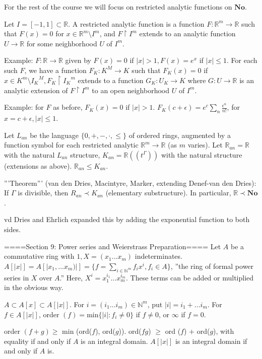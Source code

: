 For the rest of the course we will focus on restricted analytic functions on $\mathbf{No}$.

Let $I=[-1,1] \subset \mathbb{R}$. A restricted analytic function is a function $F: \mathbb{R}^m \rightarrow \mathbb{R}$ such that $F(x)=0$ for $x \in \mathbb{R}^{m} \setminus I^m$, and $F \restriction I^m$ extends to an analytic function $U \rightarrow \mathbb{R}$ for some neighborhood $U$ of $I^m$.

Example: $F: \mathbb{R} \rightarrow \mathbb{R}$ given by $F(x)=0$ if $|x|>1, F(x)=e^x$ if $|x| \leq 1$. For each such $F$, we have a function $F_K: K^M \rightarrow K$ such that $F_K(x)=0$ if $x \in K^m \setminus {I_K}^M, F_K \restriction {I_K}^m$ extends to a function $G_K: U_K \rightarrow K$ where $G: U \rightarrow \mathbb{R}$ is an analytic extension of $F \restriction I^m$ to an open neighborhood $U$ of $I^m$.

Example: for $F$ as before, $F_K(x)=0$ if $|x|>1$. $F_K(c+\epsilon)=e^{c}\sum_{n} \frac{\epsilon^n}{n!}$, for $x=c+\epsilon, |x| \leq 1$.

Let $L_{an}$ be the language $\{0,+, -, \cdot, \leq\}$ of ordered rings, augmented by a function symbol for each restricted analytic $\mathbb{R}^m \rightarrow \mathbb{R}$ (as $m$ varies). Let $\mathbb{R}_{an} = \mathbb{R}$ with the natural $L_{an}$ structure, $K_{an}=\mathbb{R}((t^{\Gamma}))$ with the natural structure (extensions as above). $\mathbb{R}_{an} \leq K_{an}$.

'''Theorem''' (van den Dries, Macintyre, Marker, extending Denef-van den Dries): If $\Gamma$ is divisible, then $R_{an} \prec K_{an}$ (elementary substructure). In particular, $\mathbb{R} \prec \mathbf{No}$.

vd Dries and Ehrlich expanded this by adding the exponential function to both sides.

====Section 9: Power series and Weierstrass Preparation====
Let $A$ be a commutative ring with $1, X=(x_1...x_m)$ indeterminates. $A[|x|]=A[|x_1, ...x_m)|]=\{f=\sum_{i \in \mathbb{N}^m}f_i x^i, f_i \in A\}$, ''the ring of formal power series in $X$ over $A$.'' Here, $X^i= x_{1}^{i_1}...x_{m}^{i_m}$. These terms can be added or multiplied in the obvious way.

$A \subset A[x] \subset A[|x|]$. For $i=(i_1...i_m ) \in \mathbb{N}^m$, put $|i|=i_1+...i_m$. For $f \in A[|x|]$, order $(f)=$min$\{|i|: f_i \neq 0\}$ if $f \neq 0$, or $\infty$ if $f=0$.

order $(f+g) \geq$ min (ord($f$), ord($g$)). ord($fg$) $\geq$ ord ($f$) $+$ ord($g$), with equality if and only if $A$ is an integral domain. $A[|x|]$ is an integral domain if and only if $A$ is.

